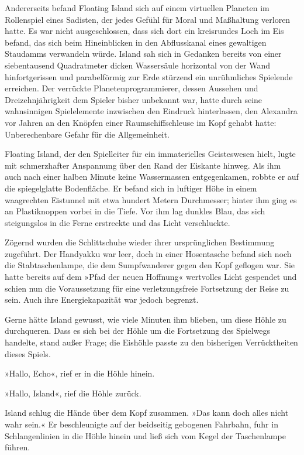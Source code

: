 Andererseits befand Floating Island sich auf einem virtuellen Planeten im Rollenspiel eines Sadisten, der jedes Gefühl für Moral und Maßhaltung verloren hatte. Es war nicht ausgeschlossen, dass sich dort ein kreisrundes Loch im Eis befand, das sich beim Hineinblicken in den Abflusskanal eines gewaltigen Staudamms verwandeln würde. Island sah sich in Gedanken bereits von einer siebentausend Quadratmeter dicken Wassersäule horizontal von der Wand hinfortgerissen und parabelförmig zur Erde stürzend ein unrühmliches Spielende erreichen. Der verrückte Planetenprogrammierer, dessen Aussehen und Dreizehnjährigkeit dem Spieler bisher unbekannt war, hatte durch seine wahnsinnigen Spielelemente inzwischen den Eindruck hinterlassen, den Alexandra vor Jahren an den Knöpfen einer Raumschiffschleuse im Kopf gehabt hatte: Unberechenbare Gefahr für die Allgemeinheit.

Floating Island, der den Spielleiter für ein immaterielles Geisteswesen hielt, lugte mit schmerzhafter Anspannung über den Rand der Eiskante hinweg. Als ihm auch nach einer halben Minute keine Wassermassen entgegenkamen, robbte er auf die spiegelglatte Bodenfläche. Er befand sich in luftiger Höhe in einem waagrechten Eistunnel mit etwa hundert Metern Durchmesser; hinter ihm ging es an Plastiknoppen vorbei in die Tiefe. Vor ihm lag dunkles Blau, das sich steigungslos in die Ferne erstreckte und das Licht verschluckte.

Zögernd wurden die Schlittschuhe wieder ihrer ursprünglichen Bestimmung zugeführt. Der Handyakku war leer, doch in einer Hosentasche befand sich noch die Stabtaschenlampe, die dem Sumpfwanderer gegen den Kopf geflogen war. Sie hatte bereits auf dem »Pfad der neuen Hoffnung« wertvolles Licht gespendet und schien nun die Voraussetzung für eine verletzungsfreie Fortsetzung der Reise zu sein. Auch ihre Energiekapazität war jedoch begrenzt.

Gerne hätte Island gewusst, wie viele Minuten ihm blieben, um diese Höhle zu durchqueren. Dass es sich bei der Höhle um die Fortsetzung des Spielwegs handelte, stand außer Frage; die Eishöhle passte zu den bisherigen Verrücktheiten dieses Spiels.

»Hallo, Echo«, rief er in die Höhle hinein.

»Hallo, Island«, rief die Höhle zurück.

Island schlug die Hände über dem Kopf zusammen. »Das kann doch alles nicht wahr sein.« Er beschleunigte auf der beidseitig gebogenen Fahrbahn, fuhr in Schlangenlinien in die Höhle hinein und ließ sich vom Kegel der Taschenlampe führen.

